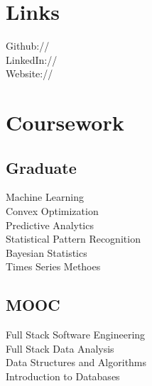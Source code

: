 \documentclass[]{Current-DS}
\begin{document}
\begin{minipage}[t]{0.33\textwidth}

\section{Links} 
Github:// \href{https://github.com/karlzhang-hhg}{} \\
LinkedIn://  \href{www.linkedin.com/in/kungang-zhang}{} \\
Website:// \href{https://sites.google.com/a/u.northwestern.edu/kungang-zhang/}{}
\sectionsep


\section{Coursework}
\subsection{Graduate}
Machine Learning \\
Convex Optimization \\
Predictive Analytics \\
Statistical Pattern Recognition \\
Bayesian Statistics \\
Times Series Methoes
\sectionsep

\subsection{MOOC}
Full Stack Software Engineering \\
Full Stack Data Analysis \\
Data Structures and Algorithms \\
Introduction to Databases
\sectionsep



\end{minipage}
\end{document}
